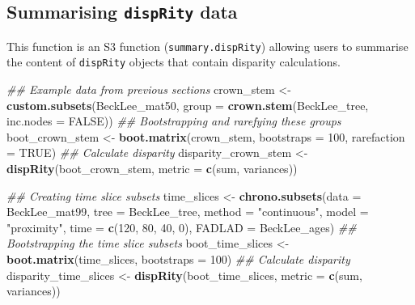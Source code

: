 \documentclass[
]{book}
\newenvironment{Shaded}{\begin{snugshade}}{\end{snugshade}}
\newcommand{\CommentTok}[1]{\textcolor[rgb]{0.56,0.35,0.01}{\textit{#1}}}
\newcommand{\DataTypeTok}[1]{\textcolor[rgb]{0.13,0.29,0.53}{#1}}
\newcommand{\DecValTok}[1]{\textcolor[rgb]{0.00,0.00,0.81}{#1}}
\newcommand{\KeywordTok}[1]{\textcolor[rgb]{0.13,0.29,0.53}{\textbf{#1}}}
\newcommand{\NormalTok}[1]{#1}
\newcommand{\OtherTok}[1]{\textcolor[rgb]{0.56,0.35,0.01}{#1}}
\newcommand{\StringTok}[1]{\textcolor[rgb]{0.31,0.60,0.02}{#1}}
\begin{document}
\hypertarget{summarising-disprity-data}{%
\subsection{\texorpdfstring{Summarising \texttt{dispRity} data}{Summarising dispRity data}}\label{summarising-disprity-data}}

This function is an S3 function (\texttt{summary.dispRity}) allowing users to summarise the content of \texttt{dispRity} objects that contain disparity calculations.

\begin{Shaded}
\begin{Highlighting}[]
\CommentTok{\#\# Example data from previous sections}
\NormalTok{crown\_stem \textless{}{-}}\StringTok{ }\KeywordTok{custom.subsets}\NormalTok{(BeckLee\_mat50,}
                             \DataTypeTok{group =} \KeywordTok{crown.stem}\NormalTok{(BeckLee\_tree,}
                             \DataTypeTok{inc.nodes =} \OtherTok{FALSE}\NormalTok{))}
\CommentTok{\#\# Bootstrapping and rarefying these groups}
\NormalTok{boot\_crown\_stem \textless{}{-}}\StringTok{ }\KeywordTok{boot.matrix}\NormalTok{(crown\_stem, }\DataTypeTok{bootstraps =} \DecValTok{100}\NormalTok{,}
                               \DataTypeTok{rarefaction =} \OtherTok{TRUE}\NormalTok{)}
\CommentTok{\#\# Calculate disparity}
\NormalTok{disparity\_crown\_stem \textless{}{-}}\StringTok{ }\KeywordTok{dispRity}\NormalTok{(boot\_crown\_stem,}
                                 \DataTypeTok{metric =} \KeywordTok{c}\NormalTok{(sum, variances))}

\CommentTok{\#\# Creating time slice subsets}
\NormalTok{time\_slices \textless{}{-}}\StringTok{ }\KeywordTok{chrono.subsets}\NormalTok{(}\DataTypeTok{data =}\NormalTok{ BeckLee\_mat99,}
                              \DataTypeTok{tree =}\NormalTok{ BeckLee\_tree,}
                              \DataTypeTok{method =} \StringTok{"continuous"}\NormalTok{,}
                              \DataTypeTok{model =} \StringTok{"proximity"}\NormalTok{,}
                              \DataTypeTok{time =} \KeywordTok{c}\NormalTok{(}\DecValTok{120}\NormalTok{, }\DecValTok{80}\NormalTok{, }\DecValTok{40}\NormalTok{, }\DecValTok{0}\NormalTok{),}
                              \DataTypeTok{FADLAD =}\NormalTok{ BeckLee\_ages)}
\CommentTok{\#\# Bootstrapping the time slice subsets}
\NormalTok{boot\_time\_slices \textless{}{-}}\StringTok{ }\KeywordTok{boot.matrix}\NormalTok{(time\_slices, }\DataTypeTok{bootstraps =} \DecValTok{100}\NormalTok{)}
\CommentTok{\#\# Calculate disparity}
\NormalTok{disparity\_time\_slices \textless{}{-}}\StringTok{ }\KeywordTok{dispRity}\NormalTok{(boot\_time\_slices,}
                                  \DataTypeTok{metric =} \KeywordTok{c}\NormalTok{(sum, variances))}


\end{Highlighting}
\end{Shaded}
\end{document}
